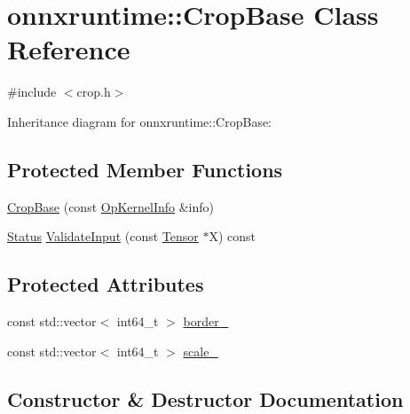 \hypertarget{classonnxruntime_1_1CropBase}{}\section{onnxruntime\+:\+:Crop\+Base Class Reference}
\label{classonnxruntime_1_1CropBase}


{\ttfamily \#include $<$crop.\+h$>$}



Inheritance diagram for onnxruntime\+:\+:Crop\+Base\+:
\subsection*{Protected Member Functions}
\begin{DoxyCompactItemize}
\item 
\mbox{\hyperlink{classonnxruntime_1_1CropBase_aa7d823e2251c4f64e109088690ddd61b}{Crop\+Base}} (const \mbox{\hyperlink{classonnxruntime_1_1OpKernelInfo}{Op\+Kernel\+Info}} \&info)
\item 
\mbox{\hyperlink{classonnxruntime_1_1common_1_1Status}{Status}} \mbox{\hyperlink{classonnxruntime_1_1CropBase_ad79f0a89750bc76be225711356476ec0}{Validate\+Input}} (const \mbox{\hyperlink{classonnxruntime_1_1Tensor}{Tensor}} $\ast$X) const
\end{DoxyCompactItemize}
\subsection*{Protected Attributes}
\begin{DoxyCompactItemize}
\item 
const std\+::vector$<$ int64\+\_\+t $>$ \mbox{\hyperlink{classonnxruntime_1_1CropBase_a555a90a84b1501aa17b85cd4e5ebcc3a}{border\+\_\+}}
\item 
const std\+::vector$<$ int64\+\_\+t $>$ \mbox{\hyperlink{classonnxruntime_1_1CropBase_a5605a9f5e6280eb96ea575a9db041763}{scale\+\_\+}}
\end{DoxyCompactItemize}


\subsection{Constructor \& Destructor Documentation}
\mbox{\label{classonnxruntime_1_1CropBase_aa7d823e2251c4f64e109088690ddd61b}} 
